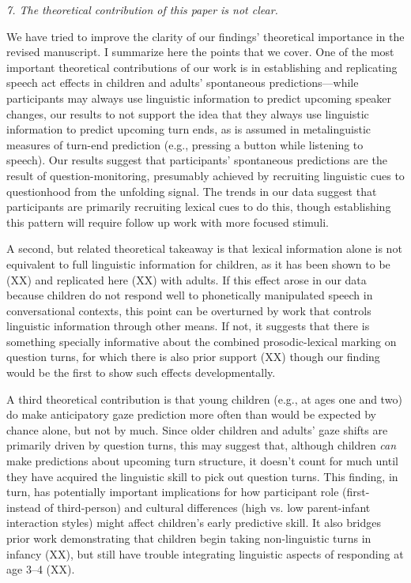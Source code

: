 \documentclass[11pt,a4paper]{letter} %
\begin{document}
\begin{letter}{}
\smallskip

\noindent \textit{7. The theoretical contribution of this paper is not clear.}

\noindent We have tried to improve the clarity of our findings' theoretical importance in the revised manuscript. I summarize here the points that we cover. One of the most important theoretical contributions of our work is in establishing and replicating speech act effects in children and adults' spontaneous predictions---while participants may always use linguistic information to predict upcoming speaker changes, our results to not support the idea that they always use linguistic information to predict upcoming turn ends, as is assumed in metalinguistic measures of turn-end prediction (e.g., pressing a button while listening to speech). Our results suggest that participants' spontaneous predictions are the result of question-monitoring, presumably achieved by recruiting linguistic cues to questionhood from the unfolding signal. The trends in our data suggest that participants are primarily recruiting lexical cues to do this, though establishing this pattern will require follow up work with more focused stimuli.

A second, but related theoretical takeaway is that lexical information alone is not equivalent to full linguistic information for children, as it has been shown to be (XX) and replicated here (XX) with adults. If this effect arose in our data because children do not respond well to phonetically manipulated speech in conversational contexts, this point can be overturned by work that controls linguistic information through other means. If not, it suggests that there is something specially informative about the combined prosodic-lexical marking on question turns, for which there is also prior support (XX) though our finding would be the first to show such effects developmentally.

A third theoretical contribution is that young children (e.g., at ages one and two) do make anticipatory gaze prediction more often than would be expected by chance alone, but not by much. Since older children and adults' gaze shifts are primarily driven by question turns, this may suggest that, although children \textit{can} make predictions about upcoming turn structure, it doesn't count for much until they have acquired the linguistic skill to pick out question turns. This finding, in turn, has potentially important implications for how participant role (first- instead of third-person) and cultural differences (high vs. low parent-infant interaction styles) might affect children's early predictive skill. It also bridges prior work demonstrating that children begin taking non-linguistic turns in infancy (XX), but still have trouble integrating linguistic aspects of responding at age 3--4 (XX).


\end{letter}
\end{document}
